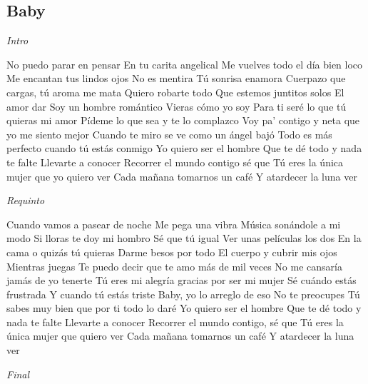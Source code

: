 \subsection{Baby}
\noindent

\vspace{1cm}

\begin{guitar}
	\begin{multicols}{2}
		\textit{Intro}
		\par 

		No puedo parar en pensar
		En tu carita angelical
		Me vuelves todo el día bien loco
		Me encantan tus lindos ojos
		No es mentira
		Tú sonrisa enamora
		Cuerpazo que cargas, tú aroma me mata
		Quiero robarte todo
		Que estemos juntitos solos
		El amor dar
		Soy un hombre romántico
		Vieras cómo yo soy
		Para ti seré lo que tú quieras mi amor
		Pídeme lo que sea y te lo complazco
		Voy pa' contigo y neta que yo me siento mejor
		Cuando te miro se ve como un ángel bajó
		Todo es más perfecto cuando tú estás conmigo
		Yo quiero ser el hombre
		Que te dé todo y nada te falte
		Llevarte a conocer
		Recorrer el mundo contigo sé que
		Tú eres la única mujer que yo quiero ver
		Cada mañana tomarnos un café
		Y atardecer la luna ver

		\par
		\textit{Requinto}
		\par

		Cuando vamos a pasear de noche
		Me pega una vibra
		Música sonándole a mi modo
		Si lloras te doy mi hombro
		Sé que tú igual
		Ver unas películas los dos
		En la cama o quizás tú quieras
		Darme besos por todo
		El cuerpo y cubrir mis ojos
		Mientras juegas
		Te puedo decir que te amo más de mil veces
		No me cansaría jamás de yo tenerte
		Tú eres mi alegría gracias por ser mi mujer
		Sé cuándo estás frustrada
		Y cuando tú estás triste
		Baby, yo lo arreglo de eso
		No te preocupes
		Tú sabes muy bien que por ti todo lo daré
		Yo quiero ser el hombre
		Que te dé todo y nada te falte
		Llevarte a conocer
		Recorrer el mundo contigo, sé que
		Tú eres la única mujer que quiero ver
		Cada mañana tomarnos un café
		Y atardecer la luna ver

		\par
		\textit{Final}


	\end{multicols}
\end{guitar}
